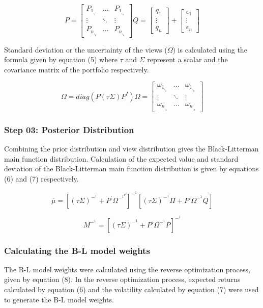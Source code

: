 \documentclass[conference]{IEEEtran}
\begin{document}
\begin{equation}
P  = 
\begin{bmatrix}
P_1_,_1 & \ldots & P_1_,_n\\
\vdots & \ddots & \vdots\\
P_n_,_1 & \ldots & P_n_,_n
\end{bmatrix}
Q = 
\begin{bmatrix}
q_1\\
\vdots\\
q_n
\end{bmatrix}
+
\begin{bmatrix}
\epsilon_1\\
\vdots\\
\epsilon_n
\end{bmatrix}
\end{equation} 

Standard deviation or the uncertainty of the views ($\Omega$) is calculated using the formula given by equation (5) where $\tau$ and $\Sigma$ represent a scalar and the covariance matrix of the portfolio respectively. 

\begin{equation}
\Omega = diag(P(\tau\Sigma)P^I){}
\Omega = 
\begin{bmatrix}
\omega _1_,_1 & \ldots & \omega _1_,_n\\
\vdots & \ddots & \vdots\\
\omega _n_,_1 & \ldots & \omega _n_,_n
\end{bmatrix}
\end{equation} 

\subsubsection{Step 03: Posterior Distribution}
Combining the prior distribution and view distribution gives the Black-Litterman main function distribution. Calculation of the expected value and standard deviation of the Black-Litterman main function distribution is given by equations (6) and (7) respectively.

\begin{equation}
\overline{\mu} = [(\tau\Sigma)^-^1 + P^{'}\Omega^-^1^P]^-^1[(\tau\Sigma)^-^1\Pi + P{'}\Omega^-^1Q]
\end{equation} 

\begin{equation}
M^-^1 = [(\tau\Sigma)^-^1 + P{'}\Omega^-^1P]^-^1
\end{equation} 

\subsubsection{Calculating the B-L model weights}
The B-L model weights were calculated using the reverse optimization process, given by equation (8). In the reverse optimization process, expected returns calculated by equation (6) and the volatility calculated by equation (7) were used to generate the B-L model weights.
\end{document}
